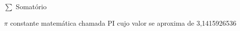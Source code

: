 \begin{simbolos}
  \item[$ \sum $] Somatório
  \item[$ \pi $] constante matemática chamada PI cujo valor se aproxima de 3,1415926536
\end{simbolos}
